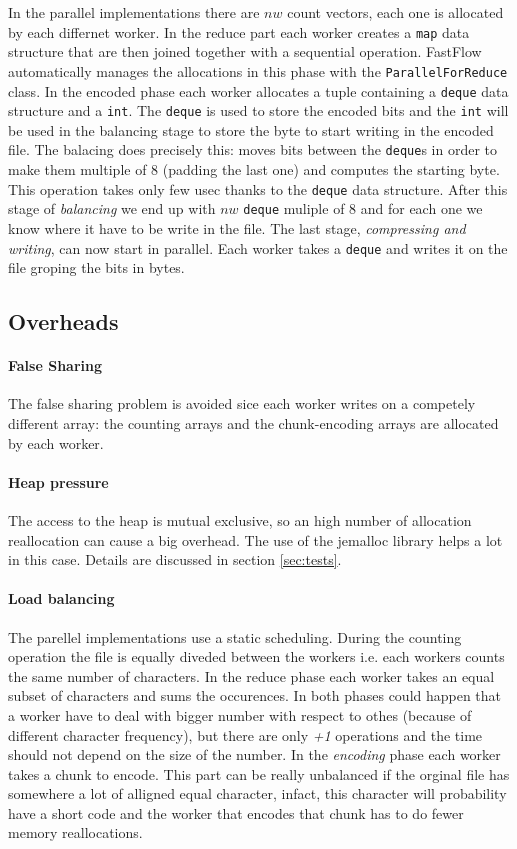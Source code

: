 \documentclass[12pt, letterpaper]{article}
\begin{document}
In the parallel implementations there are $nw$ count vectors, each one is allocated by each differnet worker. In the reduce part each worker creates a \texttt{map} data structure that are then joined together with a sequential operation. FastFlow automatically manages the allocations in this phase with the \texttt{ParallelForReduce} class. In the encoded phase each worker allocates a tuple containing a \texttt{deque} data structure and a \texttt{int}. The \texttt{deque} is used to store the encoded bits and the \texttt{int} will be used in the balancing stage to store the byte to start writing in the encoded file. The balacing does precisely this: moves bits between the \texttt{deque}s in order to make them multiple of 8 (padding the last one) and computes the starting byte. This operation takes only few usec thanks to the \texttt{deque} data structure. After this stage of \textit{balancing} we end up with $nw$ \texttt{deque} muliple of 8 and for each one we know where it have to be write in the file. The last stage, \textit{compressing and writing}, can now start in parallel. Each worker takes a \texttt{deque} and writes it on the file groping the bits in bytes.



\subsection{Overheads}

\paragraph*{False Sharing}
The false sharing problem is avoided sice each worker writes on a competely different array: the counting arrays and the chunk-encoding arrays are allocated by each worker.

\paragraph*{Heap pressure}
The access to the heap is mutual exclusive, so an high number of allocation reallocation can cause a big overhead. The use of the jemalloc library helps a lot in this case. Details are discussed in section \ref{sec:tests}.

\paragraph*{Load balancing}
The parellel implementations use a static scheduling. During the counting operation the file is equally diveded between the workers i.e. each workers counts the same number of characters. In the reduce phase each worker takes an equal subset of characters and sums the occurences. In both phases could happen that a worker have to deal with bigger number with respect to othes (because of different character frequency), but there are only \textit{+1} operations and the time should not depend on the size of the number. In the \textit{encoding} phase each worker takes a chunk to encode. This part can be really unbalanced if the orginal file has somewhere a lot of alligned equal character, infact, this character will probability have a short code and the worker that encodes that chunk has to do fewer memory reallocations.
\end{document}
